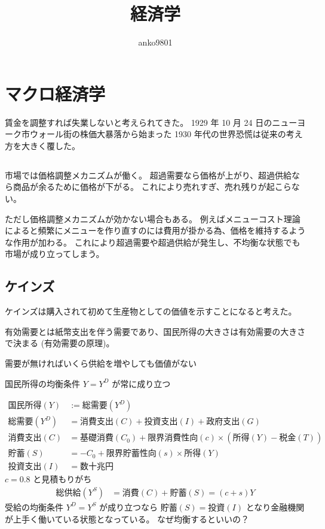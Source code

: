 \documentclass[uplatex,dvipdfmx,a4paper,11pt]{jlreq}
\title{経済学}
\author{anko9801}
\numberwithin{equation}{section}
\theoremstyle{definition}
\begin{document}
\maketitle
\tableofcontents
\clearpage

\section{マクロ経済学}
賃金を調整すれば失業しないと考えられてきた。
1929 年 10 月 24 日のニューヨーク市ウォール街の株価大暴落から始まった 1930 年代の世界恐慌は従来の考え方を大きく覆した。

\subsection{}
市場では価格調整メカニズムが働く。
超過需要なら価格が上がり、超過供給なら商品が余るために価格が下がる。
これにより売れすぎ、売れ残りが起こらない。

ただし価格調整メカニズムが効かない場合もある。
例えばメニューコスト理論によると頻繁にメニューを作り直すのには費用が掛かる為、価格を維持するような作用が加わる。
これにより超過需要や超過供給が発生し、不均衡な状態でも市場が成り立ってしまう。

\subsection{ケインズ}

ケインズは購入されて初めて生産物としての価値を示すことになると考えた。
\begin{definition}
  有効需要とは紙幣支出を伴う需要であり、国民所得の大きさは有効需要の大きさで決まる (有効需要の原理)。
\end{definition}
需要が無ければいくら供給を増やしても価値がない

国民所得の均衡条件 $Y = Y^D$ が常に成り立つ

\begin{align}
  国民所得 (Y)  & := 総需要 (Y^D)                                       \\
  総需要 (Y^D) & = 消費支出 (C) + 投資支出 (I) + 政府支出 (G)                   \\
  消費支出 (C)  & = 基礎消費 (C_0) + 限界消費性向 (c) \times (所得 (Y) - 税金 (T)) \\
  貯蓄 (S)    & = - C_0 + 限界貯蓄性向 (s) \times 所得 (Y)                 \\
  投資支出 (I)  & = 数十兆円
\end{align}
$c = 0.8$ と見積もりがち
\begin{align}
  総供給 (Y^S) & = 消費 (C) + 貯蓄 (S) = (c + s)Y
\end{align}
受給の均衡条件 $Y^D = Y^S$ が成り立つなら $貯蓄 (S) = 投資 (I)$ となり金融機関が上手く働いている状態となっている。
なぜ均衡するといいの？
\end{document}
